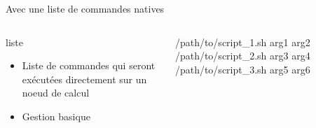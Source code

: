 \documentclass{beamer}
\begin{document}
\begin{frame}{Avec une liste de commandes natives}
	\begin{columns}
	\begin{column}[l]{0.4\linewidth}
        \begin{exampleblock}{liste}
            \begin{itemize}
                \item Liste de commandes qui seront exécutées directement sur un noeud de calcul
                \item Gestion basique
            \end{itemize}
        \end{exampleblock}
	\end{column}
	\begin{column}[r]{0.6\linewidth}
        /path/to/script\_1.sh arg1 arg2\newline
        /path/to/script\_2.sh arg3 arg4\newline
        /path/to/script\_3.sh arg5 arg6\newline
	\end{column}
	\end{columns}
    
\end{frame}
\end{document}
